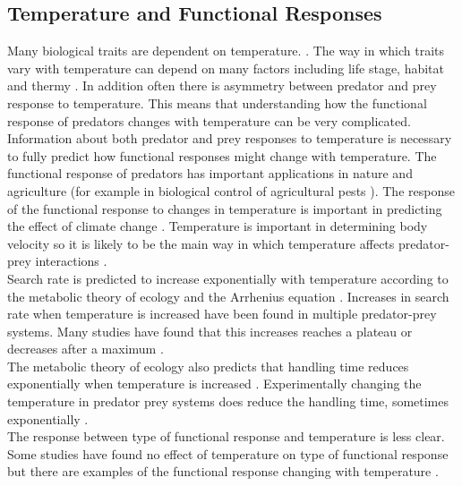 \documentclass{article}
\begin{document}
\subsection{Temperature and Functional Responses}
Many biological traits are dependent on temperature. \cite{Dell2014TemperatureStrategy,Dell2011SystematicTraits}. The way in which traits vary with temperature can depend on many factors including life stage\cite{Cator2019MoreResearch}, habitat \cite{Dell2011SystematicTraits} and thermy \cite{Dell2014TemperatureStrategy}. In addition often there is asymmetry between predator and prey response to temperature\cite{Dell2014TemperatureStrategy}. This means that understanding how the functional response of predators changes with temperature can be very complicated. Information about both predator and prey responses to temperature is necessary to fully predict how functional responses might change with temperature. The functional response of predators has important applications in nature and agriculture (for example in biological control of agricultural pests \cite{Gilioli2005TemperatureIndividuals} ). The response of the functional response to changes in temperature is important in predicting the effect of climate change \cite{Ohlund2014TemperaturePrey}.  Temperature is important in determining body velocity so it is likely to be the main way in which temperature affects predator-prey interactions \cite{Dell2014TemperatureStrategy}.\\
Search rate is predicted to increase exponentially with temperature according to the metabolic theory of ecology and the Arrhenius equation \cite{Brown2004TowardEcology,Dell2014TemperatureStrategy,Englund2011TemperatureResponse}. Increases in search rate when temperature is increased have been found in multiple predator-prey systems\cite{Gilioli2005TemperatureIndividuals,Zamani2006Temperature-dependentAphid}. Many studies have found that this increases reaches a plateau or decreases after a maximum \cite{Thompson1978TowardsElegans,Zamani2006Temperature-dependentAphid,Sentis2012UsingEfficiency}.
\\
The metabolic theory of ecology \cite{Brown2004TowardEcology} also predicts that handling time reduces exponentially when temperature is increased \cite{Dell2014TemperatureStrategy}. Experimentally changing the temperature in predator prey systems does reduce the handling time\cite{Thompson1978TowardsElegans,McCoull1998EffectNaucoridae,Jalali2010EffectPersicae,Zamani2006Temperature-dependentAphid}, sometimes exponentially \cite{Sentis2012UsingEfficiency,}. \\
The response between type of functional response and temperature is less clear. Some studies have found no effect of temperature on type of functional response  \cite{Sentis2012UsingEfficiency} but there are examples of the functional response changing with temperature \cite{Taylor2003EffectAmericanus}.
\end{document}
